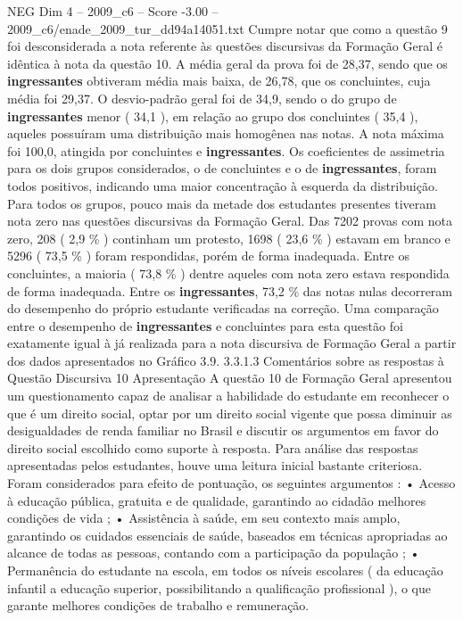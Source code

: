 \begin{textsample}{NEG Dim 4 – 2009\_c6 – Score -3.00 – 2009\_c6/enade\_2009\_tur\_dd94a14051.txt}
Cumpre notar que como a questão 9 foi desconsiderada a nota referente às questões discursivas da Formação Geral é idêntica à nota da questão 10.
A média geral da prova foi de 28,37, sendo que os \textbf{ingressantes} obtiveram média mais baixa, de 26,78, que os concluintes, cuja média foi 29,37.
O desvio-padrão geral foi de 34,9, sendo o do grupo de \textbf{ingressantes} menor ( 34,1 ), em relação ao grupo dos concluintes ( 35,4 ), aqueles possuíram uma distribuição mais homogênea nas notas.
A nota máxima foi 100,0, atingida por concluintes e \textbf{ingressantes}.
Os coeficientes de assimetria para os dois grupos considerados, o de concluintes e o de \textbf{ingressantes}, foram todos positivos, indicando uma maior concentração à esquerda da distribuição.
Para todos os grupos, pouco mais da metade dos estudantes presentes tiveram nota zero nas questões discursivas da Formação Geral.
Das 7202 provas com nota zero, 208 ( 2,9 \% ) continham um protesto, 1698 ( 23,6 \% ) estavam em branco e 5296 ( 73,5 \% ) foram respondidas, porém de forma inadequada.
Entre os concluintes, a maioria ( 73,8 \% ) dentre aqueles com nota zero estava respondida de forma inadequada.
Entre os \textbf{ingressantes}, 73,2 \% das notas nulas decorreram do desempenho do próprio estudante verificadas na correção.
Uma comparação entre o desempenho de \textbf{ingressantes} e concluintes para esta questão foi exatamente igual à já realizada para a nota discursiva de Formação Geral a partir dos dados apresentados no Gráfico 3.9. 3.3.1.3 Comentários sobre as respostas à Questão Discursiva 10 Apresentação A questão 10 de Formação Geral apresentou um questionamento capaz de analisar a habilidade do estudante em reconhecer o que é um direito social, optar por um direito social vigente que possa diminuir as desigualdades de renda familiar no Brasil e discutir os argumentos em favor do direito social escolhido como suporte à resposta.
Para análise das respostas apresentadas pelos estudantes, houve uma leitura inicial bastante criteriosa.
Foram considerados para efeito de pontuação, os seguintes argumentos : • Acesso à educação pública, gratuita e de qualidade, garantindo ao cidadão melhores condições de vida ; • Assistência à saúde, em seu contexto mais amplo, garantindo os cuidados essenciais de saúde, baseados em técnicas apropriadas ao alcance de todas as pessoas, contando com a participação da população ; • Permanência do estudante na escola, em todos os níveis escolares ( da educação infantil a educação superior, possibilitando a qualificação profissional ), o que garante melhores condições de trabalho e remuneração.

\end{textsample}
